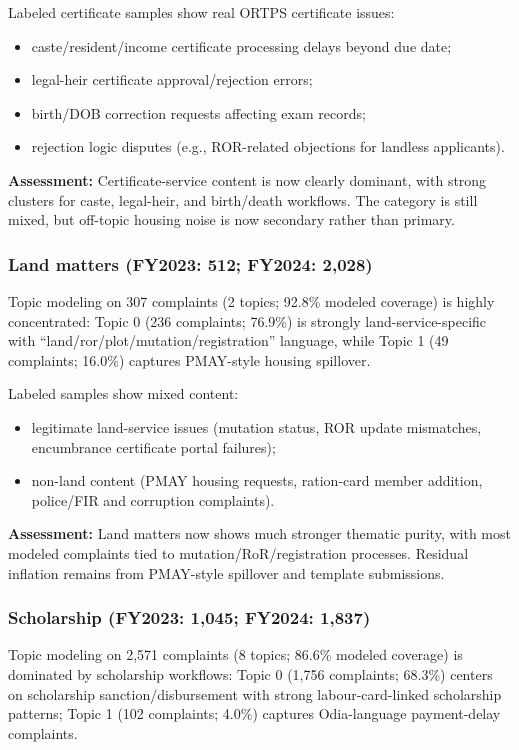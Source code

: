 \documentclass[11pt,a4paper]{article}
\begin{document}
Labeled certificate samples show real ORTPS certificate issues:
\begin{itemize}
    \item caste/resident/income certificate processing delays beyond due date;
    \item legal-heir certificate approval/rejection errors;
    \item birth/DOB correction requests affecting exam records;
    \item rejection logic disputes (e.g., ROR-related objections for landless applicants).
\end{itemize}

\textbf{Assessment:} Certificate-service content is now clearly dominant, with strong clusters for caste, legal-heir, and birth/death workflows. The category is still mixed, but off-topic housing noise is now secondary rather than primary.

\subsubsection{Land matters (FY2023: 512; FY2024: 2,028)}

Topic modeling on 307 complaints (2 topics; 92.8\% modeled coverage) is highly concentrated: Topic 0 (236 complaints; 76.9\%) is strongly land-service-specific with ``land/ror/plot/mutation/registration'' language, while Topic 1 (49 complaints; 16.0\%) captures PMAY-style housing spillover.

Labeled samples show mixed content:
\begin{itemize}
    \item legitimate land-service issues (mutation status, ROR update mismatches, encumbrance certificate portal failures);
    \item non-land content (PMAY housing requests, ration-card member addition, police/FIR and corruption complaints).
\end{itemize}

\textbf{Assessment:} Land matters now shows much stronger thematic purity, with most modeled complaints tied to mutation/RoR/registration processes. Residual inflation remains from PMAY-style spillover and template submissions.

\subsubsection{Scholarship (FY2023: 1,045; FY2024: 1,837)}

Topic modeling on 2,571 complaints (8 topics; 86.6\% modeled coverage) is dominated by scholarship workflows: Topic 0 (1,756 complaints; 68.3\%) centers on scholarship sanction/disbursement with strong labour-card-linked scholarship patterns; Topic 1 (102 complaints; 4.0\%) captures Odia-language payment-delay complaints.
\end{document}
